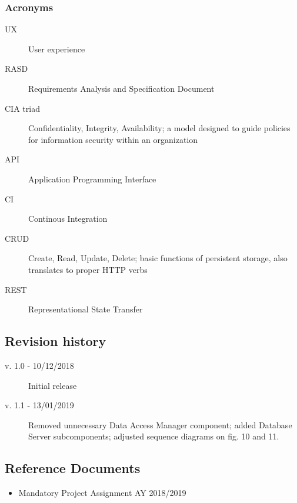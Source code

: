 \documentclass[../main.tex]{subfiles}
\begin{document}
	\subsubsection{Acronyms}
		\begin{description}
			\item[UX] User experience
			\item [RASD] Requirements Analysis and Specification Document
			\item [CIA triad] Confidentiality, Integrity, Availability; a model designed to guide policies for information security within an organization
			\item [API] Application Programming Interface
			\item [CI] Continous Integration
		    \item [CRUD] Create, Read, Update, Delete; basic functions of persistent storage, also translates to proper HTTP verbs
			\item [REST] Representational State Transfer
		\end{description}

\subsection{Revision history}

\begin{description}
	\item [v. 1.0 - 10/12/2018] Initial release
	\item [v. 1.1 - 13/01/2019] Removed unnecessary Data Access Manager component; added Database Server subcomponents; adjusted sequence diagrams on fig. 10 and 11.
\end{description}

\subsection{Reference Documents}

\begin{itemize}

	\item{Mandatory Project Assignment AY 2018/2019}

\end{itemize}
\end{document}
